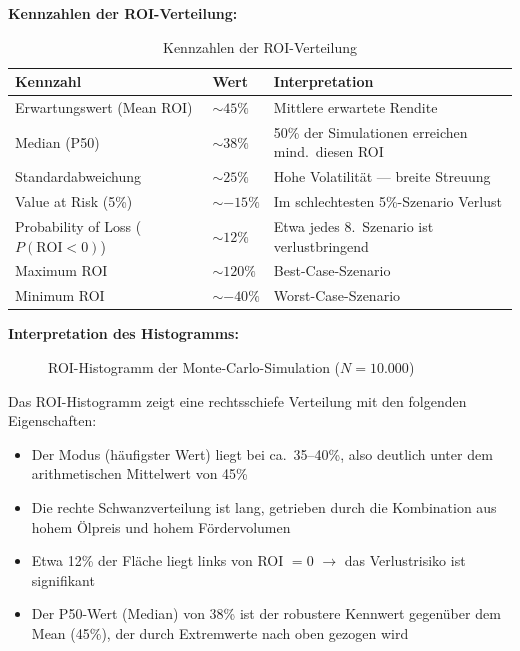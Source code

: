 \documentclass[12pt,a4paper]{article}
\begin{document}
\textbf{Kennzahlen der ROI-Verteilung:}

\begin{table}[H]
\centering
\begin{tabular}{llp{6.5cm}}
\toprule
\textbf{Kennzahl} & \textbf{Wert} & \textbf{Interpretation} \\
\midrule
Erwartungswert (Mean ROI)      & ${\sim}45\%$      & Mittlere erwartete Rendite \\
Median (P50)                   & ${\sim}38\%$      & 50\% der Simulationen erreichen mind.\ diesen ROI \\
Standardabweichung              & ${\sim}25\%$      & Hohe Volatilität — breite Streuung \\
Value at Risk (5\%)             & ${\sim}{-}15\%$   & Im schlechtesten 5\%-Szenario Verlust \\
Probability of Loss ($P(\text{ROI}<0)$) & ${\sim}12\%$ & Etwa jedes 8.\ Szenario ist verlustbringend \\
Maximum ROI                    & ${\sim}120\%$     & Best-Case-Szenario \\
Minimum ROI                    & ${\sim}{-}40\%$   & Worst-Case-Szenario \\
\bottomrule
\end{tabular}
\caption{Kennzahlen der ROI-Verteilung}
\end{table}

\textbf{Interpretation des Histogramms:}

\begin{figure}[H]
\centering
{}
\caption{ROI-Histogramm der Monte-Carlo-Simulation ($N = 10.000$)}
\end{figure}

Das ROI-Histogramm zeigt eine rechtsschiefe Verteilung mit den folgenden Eigenschaften:
\begin{itemize}[itemsep=2pt]
  \item Der Modus (häufigster Wert) liegt bei ca.\ 35–40\%, also deutlich unter dem arithmetischen Mittelwert von 45\%
  \item Die rechte Schwanzverteilung ist lang, getrieben durch die Kombination aus hohem Ölpreis und hohem Fördervolumen
  \item Etwa 12\% der Fläche liegt links von ROI $= 0$ $\rightarrow$ das Verlustrisiko ist signifikant
  \item Der P50-Wert (Median) von 38\% ist der robustere Kennwert gegenüber dem Mean (45\%), der durch Extremwerte nach oben gezogen wird
\end{itemize}
\end{document}
